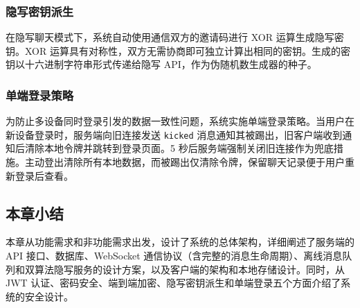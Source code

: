 \subsubsection{隐写密钥派生}

在隐写聊天模式下，系统自动使用通信双方的邀请码进行 XOR 运算生成隐写密钥。XOR 运算具有对称性，双方无需协商即可独立计算出相同的密钥。生成的密钥以十六进制字符串形式传递给隐写 API，作为伪随机数生成器的种子。

\subsubsection{单端登录策略}

为防止多设备同时登录引发的数据一致性问题，系统实施单端登录策略。当用户在新设备登录时，服务端向旧连接发送 \texttt{kicked} 消息通知其被踢出，旧客户端收到通知后清除本地令牌并跳转到登录页面。5 秒后服务端强制关闭旧连接作为兜底措施。主动登出清除所有本地数据，而被踢出仅清除令牌，保留聊天记录便于用户重新登录后查看。

\subsection{本章小结}

本章从功能需求和非功能需求出发，设计了系统的总体架构，详细阐述了服务端的 API 接口、数据库、WebSocket 通信协议（含完整的消息生命周期）、离线消息队列和双算法隐写服务的设计方案，以及客户端的架构和本地存储设计。同时，从 JWT 认证、密码安全、端到端加密、隐写密钥派生和单端登录五个方面介绍了系统的安全设计。
